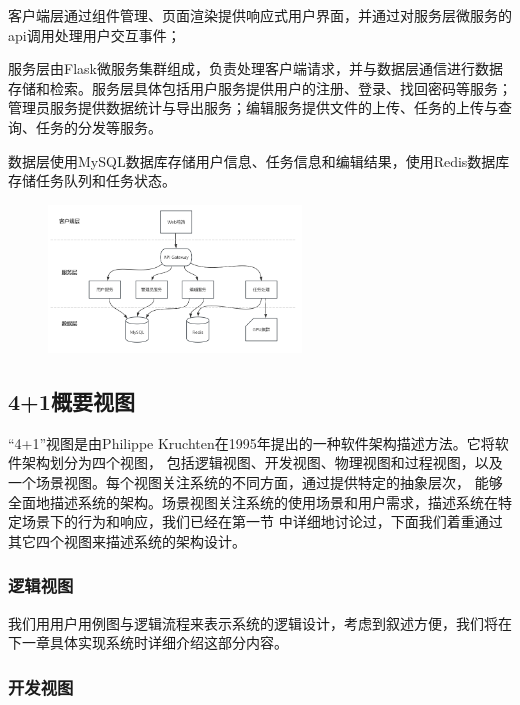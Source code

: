 客户端层通过组件管理、页面渲染提供响应式用户界面，并通过对服务层微服务的api调用处理用户交互事件；

服务层由Flask微服务集群组成，负责处理客户端请求，并与数据层通信进行数据存储和检索。服务层具体包括用户服务提供用户的注册、登录、找回密码等服务；
管理员服务提供数据统计与导出服务；编辑服务提供文件的上传、任务的上传与查询、任务的分发等服务。

数据层使用MySQL数据库存储用户信息、任务信息和编辑结果，使用Redis数据库存储任务队列和任务状态。

\begin{figure}[ht]
    \centering
    \includegraphics[width=0.6\textwidth]{source/img/system_structure.png}
    \label{fig:system-structure}
\end{figure}

\subsection{4+1概要视图}

“4+1”视图是由Philippe Kruchten在1995年提出的一种软件架构描述方法。它将软件架构划分为四个视图，
包括逻辑视图、开发视图、物理视图和过程视图，以及一个场景视图。每个视图关注系统的不同方面，通过提供特定的抽象层次，
能够全面地描述系统的架构。场景视图关注系统的使用场景和用户需求，描述系统在特定场景下的行为和响应，我们已经在第一节
中详细地讨论过，下面我们着重通过其它四个视图来描述系统的架构设计。

\subsubsection{逻辑视图}

我们用用户用例图与逻辑流程来表示系统的逻辑设计，考虑到叙述方便，我们将在下一章具体实现系统时详细介绍这部分内容。

\subsubsection{开发视图}

